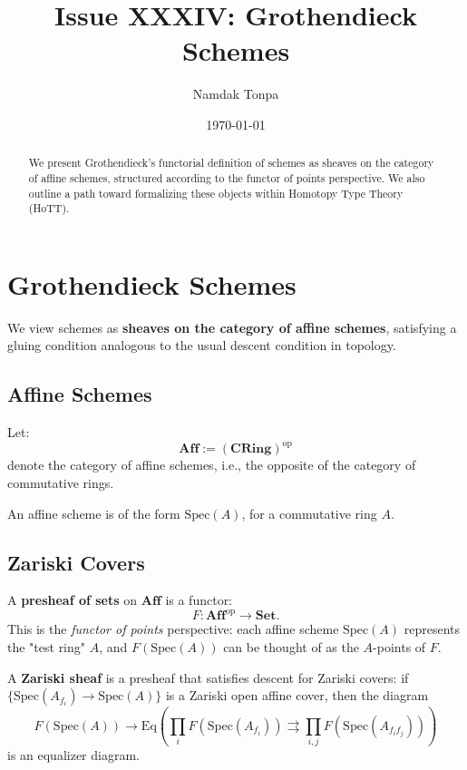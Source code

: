 \documentclass{article}
\begin{document}
\title{Issue XXXIV: Grothendieck Schemes}
\author{Namdak Tonpa}
\date{\today}

\maketitle

\begin{abstract}
We present Grothendieck’s functorial definition of schemes as sheaves on the category of affine schemes, structured according to the functor of points perspective. We also outline a path toward formalizing these objects within Homotopy Type Theory (HoTT).
\end{abstract}

\ifincludeTOC
  \tableofcontents
\fi

\section{Grothendieck Schemes}

We view schemes as \textbf{sheaves on the category of affine schemes}, satisfying a gluing condition analogous to the usual descent condition in topology.

\subsection{Affine Schemes}

Let:
\[
\mathbf{Aff} := (\mathbf{CRing})^{\mathrm{op}}
\]
denote the category of affine schemes, i.e., the opposite of the category of commutative rings.

An affine scheme is of the form $\mathrm{Spec}(A)$, for a commutative ring $A$.

\subsection{Zariski Covers}

A \textbf{presheaf of sets} on $\mathbf{Aff}$ is a functor:
\[
F : \mathbf{Aff}^{\mathrm{op}} \to \mathbf{Set}.
\]
This is the \emph{functor of points} perspective: each affine scheme $\mathrm{Spec}(A)$ represents the "test ring" $A$, and $F(\mathrm{Spec}(A))$ can be thought of as the $A$-points of $F$.

A \textbf{Zariski sheaf} is a presheaf that satisfies descent for Zariski covers: if $\{ \mathrm{Spec}(A_{f_i}) \to \mathrm{Spec}(A) \}$ is a Zariski open affine cover, then the diagram
\[
F(\mathrm{Spec}(A)) \to \mathrm{Eq} \left( \prod_i F(\mathrm{Spec}(A_{f_i})) \rightrightarrows \prod_{i,j} F(\mathrm{Spec}(A_{f_i f_j})) \right)
\]
is an equalizer diagram.
\end{document}
